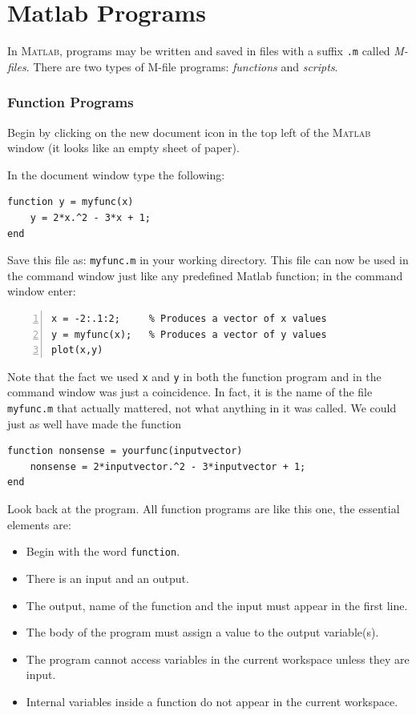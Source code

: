 \chapter{{\sc  Matlab} Programs}

In \textsc{Matlab}, programs may be written and saved in files with
a suffix \verb&.m& called {\em M-files}. There are two types of
M-file programs: {\em functions} and {\em scripts}.


\subsection*{Function Programs}

Begin by clicking on the new document icon in the top
left of the \textsc{Matlab} window (it looks like an empty sheet of paper).

In the document window type the following:
\begin{lstlisting}
function y = myfunc(x)
    y = 2*x.^2 - 3*x + 1;
end
\end{lstlisting}

Save this file as: \verb&myfunc.m& in your working directory.
This file can now be used in the command window just like any
predefined Matlab function; in the command window enter:
\begin{lstlisting}[frame=none,numbers=left]
x = -2:.1:2;     % Produces a vector of x values
y = myfunc(x);   % Produces a vector of y values
plot(x,y)
\end{lstlisting}
Note that the fact we used \verb&x& and \verb&y& in both the function
program and in the command window was just a coincidence. In fact, it
is the name of the file \verb&myfunc.m& that actually mattered, not
what anything in it was called.
We could just as well have made the function
\begin{lstlisting}
function nonsense = yourfunc(inputvector)
    nonsense = 2*inputvector.^2 - 3*inputvector + 1;
end
\end{lstlisting}

Look back at the program.
All function programs are like this one, the essential elements are:
\begin{itemize}
\item Begin with the word \verb&function&.
\item There is an input and an output.
\item The output, name of the function and the input must appear in the first line.
\item The body of the program must assign a value to the output variable(s). 
\item The program cannot access variables in the current workspace unless they
           are input.
\item Internal variables inside a function do not appear in the current workspace.
\end{itemize}

